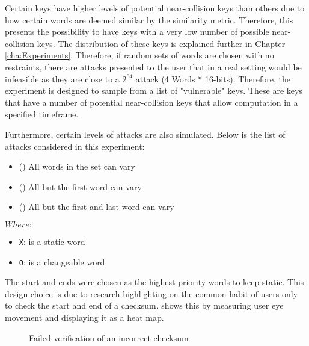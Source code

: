 Certain keys have higher levels of potential near-collision keys than others due to how certain words are deemed similar by the similarity metric. Therefore, this presents the possibility to have keys with a very low number of possible near-collision keys. The distribution of these keys is explained further in Chapter \ref{cha:Experiments}. Therefore, if random sets of words are chosen with no restraints, there are attacks presented to the user that in a real setting would be infeasible as they are close to a $2^{64}$ attack (4 Words * 16-bits). Therefore, the experiment is designed to sample from a list of "vulnerable" keys. These are keys that have a number of potential near-collision keys that allow computation in a specified timeframe. 

Furthermore, certain levels of attacks are also simulated. Below is the list of attacks considered in this experiment: 

\begin{itemize}
    \item (\OOOO) All words in the set can vary             
    \item (\XOOO) All but the first word can vary           
    \item (\XOOX) All but the first and last word can vary  
\end{itemize}

$Where: $
\begin{itemize}
    \item[] \verb|X|: is a static word
    \item[] \verb|O|: is a changeable word
\end{itemize}

The start and ends were chosen as the highest priority words to keep static. This design choice is due to research highlighting on the common habit of users only to check the start and end of a checksum. \cite{cherubini2018towards} shows this by measuring user eye movement and displaying it as a heat map.

\begin{figure}[h!]
    \centering
    \caption{Failed verification of an incorrect checksum\cite{cherubini2018towards}}
    \label{fig:heatMap}
\end{figure}

